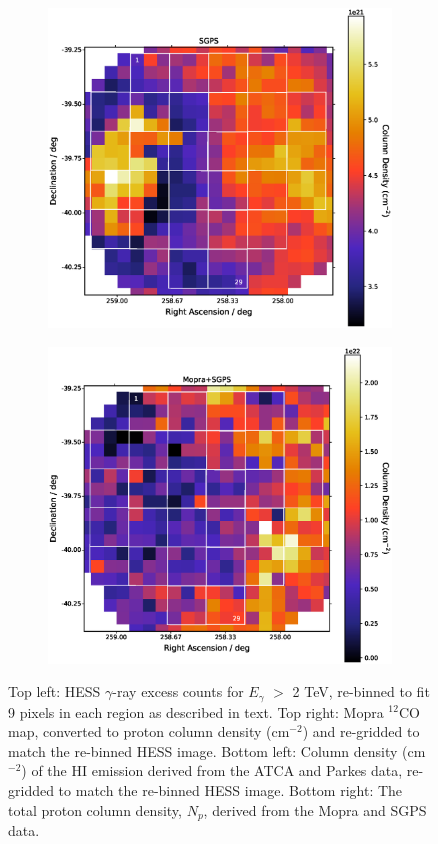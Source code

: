 \documentclass[12pt,a4paper]{article}
\begin{document}
\begin{figure}[H]
\begin{subfigure}{0.5\textwidth}
	\end{subfigure}
	\begin{subfigure}{0.5\textwidth}
		\centering
		\includegraphics[width=0.9\linewidth, height=0.25\textheight]{rxj1713_9regrid_SGPS}
	\end{subfigure}
	\begin{subfigure}{0.5\textwidth}
		\centering
		\includegraphics[width=0.9\linewidth, height=0.25\textheight]{rxj1713_9regrid_Mopra+SGPS}
	\end{subfigure}
	\caption{Top left: HESS $\gamma$-ray excess counts for $E_{\gamma}$ $>$ 2 TeV, re-binned to fit 9 pixels in each region as described in text. Top right: Mopra $^{12}$CO map, converted to proton column density (cm$^{-2}$) and re-gridded to match the re-binned HESS image. Bottom left: Column density (cm$^{-2}$) of the HI emission derived from the ATCA and Parkes data, re-gridded to match the re-binned HESS image. Bottom right: The total proton column density, $N_p$, derived from the Mopra and SGPS data.}
	\label{fig:moprahess9pixels}
\end{figure}
\end{document}
